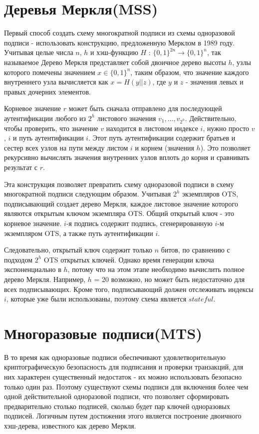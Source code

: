 \documentclass[a4paper, 14pt]{extarticle}
\begin{document}
\section{Деревья Меркля(MSS)}
Первый способ создать схему многократной подписи из схемы одноразовой подписи - использовать конструкцию, предложенную Мерклом в 1989 году. Учитывая целые числа $n$, $h$ и хэш-функцию $H$ : $\{0, 1\}^{2n} \rightarrow \{0, 1\}^{n}$, так называемое Дерево Меркля представляет собой двоичное дерево высоты $h$, узлы которого помечены значением $x \in \{0, 1\}^{n}$, таким образом, что значение каждого внутреннего узла вычисляется как $x = H(y||z)$, где $y$ и $z$ - значения левых и правых дочерних элементов.

Корневое значение $r$ может быть сначала отправлено для последующей аутентификации любого из $2^{h}$ листового значения $v_{1}, ..., v_{2^h}$. Действительно, чтобы проверить, что значение $v$ находится в листовом индексе $i$, нужно просто $v$, $i$ и путь аутентификации $i$. Этот путь аутентификации содержит братьев и сестер всех узлов на пути между листом $i$ и корнем (значения $h$). Это позволяет рекурсивно вычислять значения внутренних узлов вплоть до корня и сравнивать результат с $r$.

Эта конструкция позволяет превратить схему одноразовой подписи в схему многократной подписи следующим образом. Учитывая $2^h$ экземпляров OTS, подписывающий создает дерево Меркля, каждое листовое значение которого являются открытым ключом экземпляра OTS. Общий открытый ключ - это корневое значение. $i$-я подпись содержит подпись, сгенерированную $i$-м экземпляром OTS, а также путь аутентификации $i$.

Следовательно, открытый ключ содержит только $n$ битов, по сравнению с подходом $2^h$ OTS открытых ключей. Однако время генерации ключа экспоненциально в $h$, потому что на этом этапе необходимо вычислить полное дерево Меркля. Например, $h$ = 20 возможно, но может быть недостаточно для всех подписывающих. Кроме того, подписывающий должен отслеживать индексы $i$, которые уже были использованы, поэтому схема является $stateful$.
\newpage

\section{Многоразовые подписи(MTS)}
В то время как одноразовые подписи обеспечивают удовлетворительную криптографическую безопасность для подписания и проверки транзакций, для них характерен существенный недостаток - их можно использовать безопасно только один раз. Поэтому существуют схемы подписи для включения более чем одной действительной одноразовой подписи, что позволяет сформировать предварительно столько подписей, сколько будет пар ключей одноразовых подписей. Логичным путем достижения этого является построение двоичного хэш-дерева, известного как дерево Меркля.
\end{document}
